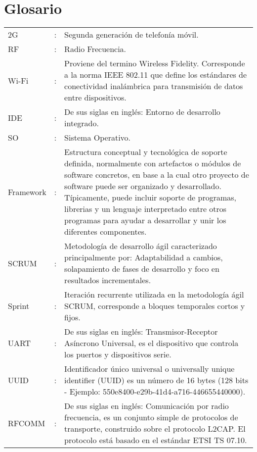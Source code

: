 

\section*{Glosario}

\begin{tabular}{lcp{10.5cm}}

2G &:& Segunda generación de telefonía móvil.\\	
	
RF &:& Radio Frecuencia.\\
	
Wi-Fi &:& Proviene del termino Wireless Fidelity. Corresponde a la norma IEEE 802.11
que define los estándares de conectividad inalámbrica para transmisión de datos entre dispositivos.\\

IDE &:& De sus siglas en inglés: Entorno de desarrollo integrado.\\

SO &:& Sistema Operativo.\\

Framework &:& Estructura conceptual y tecnológica de soporte definida, normalmente con artefactos o módulos de software concretos, en base a la cual otro proyecto de software puede ser organizado y desarrollado. Típicamente, puede incluir soporte de programas, librerias y un lenguaje interpretado entre otros programas para ayudar a desarrollar y unir los diferentes componentes.\\

SCRUM &:& Metodología de desarrollo ágil caracterizado principalmente por: Adaptabilidad a cambios, solapamiento de fases de desarrollo y foco en resultados incrementales.\\

Sprint &:& Iteración recurrente utilizada en la metodología ágil SCRUM, corresponde a bloques temporales cortos y fijos.\\

UART &:& De sus siglas en inglés: Transmisor-Receptor Asíncrono Universal, es el dispositivo que controla los puertos y dispositivos serie.\\

UUID &:& Identificador único universal o universally unique identifier (UUID) es un número de 16 bytes (128 bits - Ejemplo: 550e8400-e29b-41d4-a716-446655440000).\\

RFCOMM &:& De sus siglas en inglés: Comunicación por radio frecuencia, es un conjunto simple de protocolos de transporte, construido sobre el protocolo L2CAP. El protocolo está basado en el estándar ETSI TS 07.10.\\

\end{tabular}

